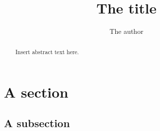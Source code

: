 \documentclass[11pt,a4paper]{article}
\title{The title}
\author{The author}
\begin{document}
\maketitle

\begin{abstract}
Insert abstract text here.
\end{abstract}

\tableofcontents

\section{A section}

\subsection{A subsection}


\end{document}
